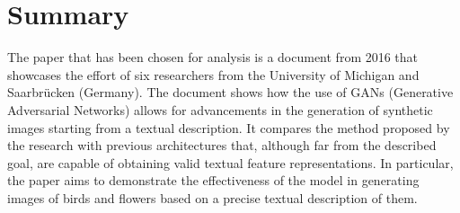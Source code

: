 \section*{Summary}

The paper that has been chosen for analysis is a document from 2016 
that showcases the effort of six researchers from the University of 
Michigan and Saarbrücken (Germany). 
The document shows how the use of GANs (Generative Adversarial Networks) 
allows for advancements in the generation of synthetic images starting 
from a textual description. 
It compares the method proposed by the research with previous architectures
that, although far from the described goal, are capable of obtaining 
valid textual feature representations. 
In particular, the paper aims to demonstrate the effectiveness of 
the model in generating images of birds and flowers based on a precise 
textual description of them.